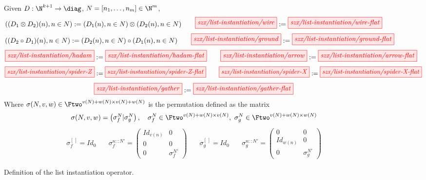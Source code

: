 \begin{figure}[tb]
\begin{mdframed}
    Given $D: \N^{k+1} \to \diag$, $N = [n_1, \dots, n_m] \in \N^m$,
    \[
        ((D_1 \otimes D_2)(n), n \in N) := (D_1(n), n \in N) \otimes (D_2(n), n \in N) 
        \qquad
        \tikzfig{szx/list-instantiation/wire}
        :=
        \tikzfig{szx/list-instantiation/wire-flat}
    \]
    \[
        ((D_2 \circ D_1)(n), n \in N) := (D_2(n), n \in N) \circ (D_1(n), n \in N) 
        \qquad
        \tikzfig{szx/list-instantiation/ground}
        :=
        \tikzfig{szx/list-instantiation/ground-flat}
    \]
    \[
        \tikzfig{szx/list-instantiation/hadam}
        :=
        \tikzfig{szx/list-instantiation/hadam-flat}
        \qquad
        \tikzfig{szx/list-instantiation/arrow}
        :=
        \tikzfig{szx/list-instantiation/arrow-flat}
    \]
    \[
        \tikzfig{szx/list-instantiation/spider-Z}
        :=
        \tikzfig{szx/list-instantiation/spider-Z-flat}
        \qquad
        \tikzfig{szx/list-instantiation/spider-X}
        :=
        \tikzfig{szx/list-instantiation/spider-X-flat}
    \]
    \[
        \tikzfig{szx/list-instantiation/gather}
        :=
        \tikzfig{szx/list-instantiation/gather-flat}
    \]
    Where $\sigma(N, v, w) \in \Ftwo^{v(N)+w(N) \times v(N)+w(N)}$ is the permutation defined as the matrix
    \[
        \sigma(N, v, w) = \begin{pmatrix}\sigma_f^N \vert \sigma_g^N \end{pmatrix}, \quad
        \sigma_f^{N} \in \Ftwo^{v(N)+w(N) \times v(N)},
        \ \sigma_g^{N} \in \Ftwo^{v(N)+w(N) \times w(N)}
    \]
    \[
    \begin{array}{llll}
        \sigma_f^{[\,]} = Id_0
        \quad &
        \sigma_f^{n::N'} =
            \begin{pmatrix}
                Id_{v(n)} & 0 \\
                0 & 0 \\
                0 & \sigma_f^{N'}
            \end{pmatrix}
        \quad &
        \sigma_g^{[\,]} = Id_0
        \quad &
        \sigma_g^{n::N'} =
            \begin{pmatrix}
                0 & 0 \\
                Id_{w(n)} & 0 \\
                0 & \sigma_g^{N'}
            \end{pmatrix}
    \end{array}
    \]
    \caption{Definition of the list instantiation operator.}%
    \label{fig:list-instantiation}
\end{mdframed}
\end{figure}

